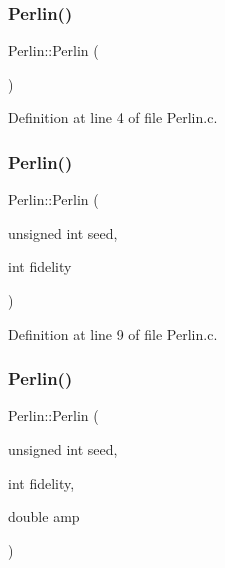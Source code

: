 \subsubsection{\texorpdfstring{Perlin()}{Perlin()}\hspace{0.1cm}{\footnotesize\ttfamily [1/3]}}
{\footnotesize\ttfamily Perlin\+::\+Perlin (\begin{DoxyParamCaption}{ }\end{DoxyParamCaption})}



Definition at line 4 of file Perlin.\+c.

\mbox{\label{class_world_architect_1_1_perlin_acacc541afc0af0ff3bda471f0d1988e9}} 
\subsubsection{\texorpdfstring{Perlin()}{Perlin()}\hspace{0.1cm}{\footnotesize\ttfamily [2/3]}}
{\footnotesize\ttfamily Perlin\+::\+Perlin (\begin{DoxyParamCaption}\item[{unsigned int}]{seed,  }\item[{int}]{fidelity }\end{DoxyParamCaption})}



Definition at line 9 of file Perlin.\+c.

\mbox{\label{class_world_architect_1_1_perlin_a683bfd35029115218bb2f775f373e7a0}} 
\subsubsection{\texorpdfstring{Perlin()}{Perlin()}\hspace{0.1cm}{\footnotesize\ttfamily [3/3]}}
{\footnotesize\ttfamily Perlin\+::\+Perlin (\begin{DoxyParamCaption}\item[{unsigned int}]{seed,  }\item[{int}]{fidelity,  }\item[{double}]{amp }\end{DoxyParamCaption})}



